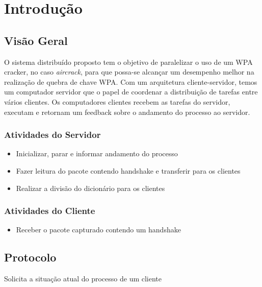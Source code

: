 \documentclass[12pt,a4paper]{report}
\begin{document}
\chapter{Introdução}
	\section{Visão Geral}
		O sistema distribuído proposto tem o objetivo de paralelizar o uso de um WPA cracker, no caso \emph{aircrack}, para que possa-se alcançar um desempenho melhor na realização de quebra de chave WPA. Com um arquitetura cliente-servidor, 
		temos um computador servidor que o papel de coordenar a distribuição de tarefas entre vários clientes. Os computadores clientes recebem as tarefas do servidor, executam e retornam um feedback sobre o andamento do processo ao servidor.
		
		\subsection{Atividades do Servidor}
		\begin{itemize}
			\item Inicializar, parar e informar andamento do processo 
			\item Fazer leitura do pacote contendo handshake e transferir para os clientes 
			\item Realizar a divisão do dicionário para os clientes 
		\end{itemize}
		
		\subsection{Atividades do Cliente}
		\begin{itemize}
			\item Receber o pacote capturado contendo um handshake
		\end{itemize}

	\clearpage
	\section{Protocolo}

		{Solicita a situação atual do processo de um cliente}
		{
		}
\end{document}
